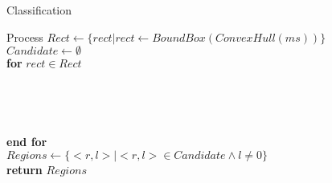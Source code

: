 \documentclass[xcolor=table,compress,blue]{beamer}
\begin{document}
\begin{frame}{Classification}
	\begin{exampleblock}{Process}
		{$Rect \leftarrow \{rect|rect \leftarrow BoundBox(ConvexHull(ms))\}$}
		\\ {$Candidate \leftarrow \emptyset$}
		\\ \textbf{for} {$rect \in Rect$}
		\\ 
		\\ 
		\\ 
		\\ 
		\\ \textbf{end for}
		\\ {$Regions \leftarrow \{<r,l>|<r,l> \in Candidate \wedge l \neq 0\}$}
		\\ \textbf{return} $Regions$
	\end{exampleblock}
\end{frame}
\end{document}
